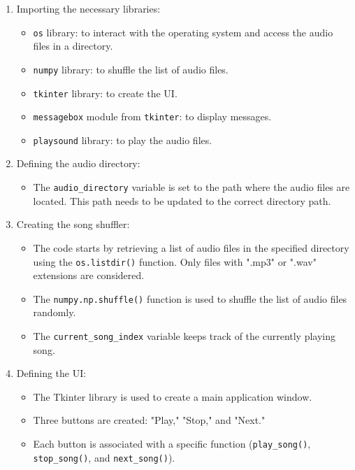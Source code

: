 \documentclass{article}
\begin{document}
\begin{enumerate}
  \item Importing the necessary libraries:
    \begin{itemize}
      \item \texttt{os} library: to interact with the operating system and access the audio files in a directory.
      \item \texttt{numpy} library: to shuffle the list of audio files.
      \item \texttt{tkinter} library: to create the UI.
      \item \texttt{messagebox} module from \texttt{tkinter}: to display messages.
      \item \texttt{playsound} library: to play the audio files.
    \end{itemize}
  
  \item Defining the audio directory:
    \begin{itemize}
      \item The \texttt{audio\_directory} variable is set to the path where the audio files are located. This path needs to be updated to the correct directory path.
    \end{itemize}
  
  \item Creating the song shuffler:
    \begin{itemize}
      \item The code starts by retrieving a list of audio files in the specified directory using the \texttt{os.listdir()} function. Only files with ".mp3" or ".wav" extensions are considered.
      \item The \texttt{numpy.np.shuffle()} function is used to shuffle the list of audio files randomly.
      \item The \texttt{current\_song\_index} variable keeps track of the currently playing song.
    \end{itemize}
  
  \item Defining the UI:
    \begin{itemize}
      \item The Tkinter library is used to create a main application window.
      \item Three buttons are created: "Play," "Stop," and "Next."
      \item Each button is associated with a specific function (\texttt{play\_song()}, \texttt{stop\_song()}, and \texttt{next\_song()}).
    \end{itemize}
  

\end{enumerate}
\end{document}
